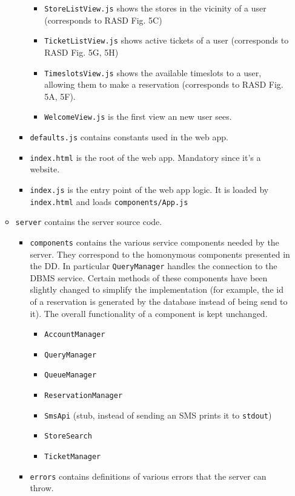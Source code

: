 \documentclass[
]{article}
\begin{document}
\begin{itemize}
\begin{itemize}
\begin{itemize}
\begin{itemize}
        \item \texttt{StoreListView.js} shows the stores in the vicinity of a user (corresponds to RASD Fig. 5C)
        \item \texttt{TicketListView.js} shows active tickets of a user (corresponds to RASD Fig. 5G, 5H)
        \item \texttt{TimeslotsView.js} shows the available timeslots to a user, allowing them to make a reservation (corresponds to RASD Fig. 5A, 5F).
        \item \texttt{WelcomeView.js} is the first view an new user sees.
      \end{itemize}
      \item \texttt{defaults.js} contains constants used in the web app.
      \item \texttt{index.html} is the root of the web app. Mandatory since it's a website.
      \item \texttt{index.js} is the entry point of the web app logic. It is loaded by \texttt{index.html} and loads \texttt{components/App.js}
    \end{itemize}
    \item \texttt{server} contains the server source code.
    \begin{itemize}
      \item \texttt{components} contains the various service components needed by the server. They correspond to the homonymous components presented in the DD. In particular \texttt{QueryManager} handles the connection to the DBMS service. Certain methods of these components have been slightly changed to simplify the implementation (for example, the id of a reservation is generated by the database instead of being send to it). The overall functionality of a component is kept unchanged.
      \begin{itemize}
        \item \texttt{AccountManager}
        \item \texttt{QueryManager}
        \item \texttt{QueueManager}
        \item \texttt{ReservationManager}
        \item \texttt{SmsApi} (stub, instead of sending an SMS prints it to \texttt{stdout})
        \item \texttt{StoreSearch}
        \item \texttt{TicketManager}
      \end{itemize}
      \item \texttt{errors} contains definitions of various errors that the server can throw.

\end{itemize}
\end{itemize}
\end{itemize}
\end{document}
